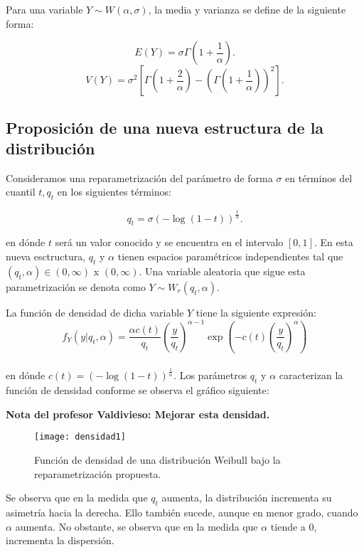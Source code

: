 Para una variable $Y \sim W(\alpha, \sigma)$, la media y varianza se define de la siguiente forma:

\[E(Y)=\sigma \Gamma\left( 1+\frac{1}{\alpha} \right).\]
\[V(Y)=\sigma^{2}\left[ \Gamma\left( 1+\frac{2}{\alpha} \right)-\left( \Gamma\left( 1+\frac{1}{\alpha} \right) \right)^{2} \right].\]

\subsection{Proposición de una nueva estructura de la distribución}

Consideramos una reparametrización del parámetro de forma $\sigma$ en términos del cuantil $t, q_{t}$ en los siguientes términos:

\[q_{t}=\sigma\left( -\log\left( 1-t \right) \right)^{\frac{1}{\alpha}}.\]

\noindent en dónde $t$ será un valor conocido y se encuentra en el intervalo $[0,1]$. En esta nueva esctructura, $q_{t}$ y $\alpha$ tienen espacios paramétricos independientes tal que $(q_{t},\alpha) \in (0,\infty)$ x $(0,\infty)$. Una variable aleatoria que sigue esta parametrización se denota como $Y \sim W_{r}(q_{t},\alpha)$.

La función de densidad de dicha variable $Y$ tiene la siguiente expresión:
\begin{equation}
f_{Y}(y| q_{t},\alpha)=\frac{\alpha c(t)}{q_{t}}\left( \frac{y}{q_{t}} \right)^{\alpha-1}\exp\left( -c(t)\left( \frac{y}{q_{t}} \right)^{\alpha} \right)
\end{equation}
\\
\noindent en dónde $c(t)= \left( -\log(1-t) \right)^{\frac{1}{\alpha}}$. Los parámetros $q_{t}$ y $\alpha$ caracterizan la función de densidad conforme se observa el gráfico siguiente:

\textbf{Nota del profesor Valdivieso: Mejorar esta densidad.}

\begin{figure}[H]
\texttt{[image: densidad1]}
\caption{Función de densidad de una distribución Weibull bajo la reparametrización propuesta.}
\end{figure}

\noindent Se observa que en la medida que $q_{t}$ aumenta, la distribución incrementa su asimetría hacia la derecha. Ello también sucede, aunque en menor grado, cuando $\alpha$ aumenta. No obstante, se observa que en la medida que $\alpha$ tiende a 0, incrementa la dispersión.

